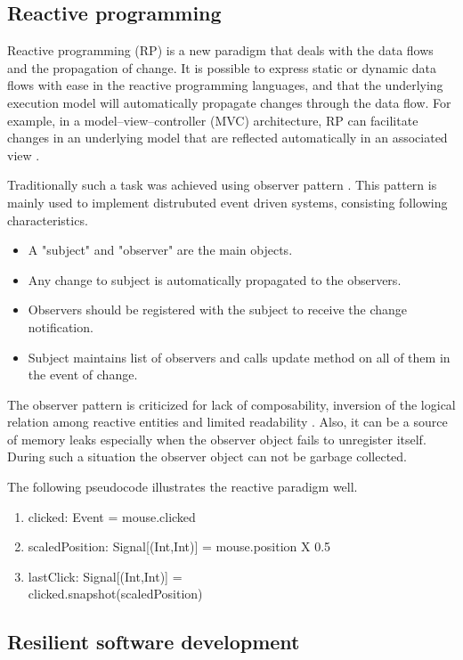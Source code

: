 \documentclass[conference]{IEEEtran}
\begin{document}
\subsection{Reactive programming}
Reactive programming (RP) is a new paradigm that deals with the data flows and the propagation of change. It is possible to express static or dynamic data flows with ease in the reactive programming languages, and that the underlying execution model will automatically propagate changes through the data flow. For example, in a model–view–controller (MVC) architecture, RP can facilitate changes in an underlying model that are reflected automatically in an associated view \cite{mvc}. \par
Traditionally such a task was achieved using observer pattern \cite{gof}. This pattern is mainly used to implement distrubuted event driven systems, consisting following characteristics.
\begin{itemize}
\item A "subject" and "observer" are the main objects.
\item Any change to subject is automatically propagated to the observers.
\item Observers should be registered with the subject to receive the change notification.
\item Subject maintains list of observers and calls update method on all of them in the event of change.
\end {itemize}
The observer pattern is criticized for lack of composability, inversion of the logical relation among reactive entities and limited readability \cite{observer}. Also, it can be a source of memory leaks especially when the observer object fails to unregister itself. During such a situation the observer object can not be garbage collected. \par

The following pseudocode illustrates the reactive paradigm well.

\begin{enumerate}
\item clicked: Event = mouse.clicked
\item scaledPosition: Signal[(Int,Int)] = mouse.position X 0.5
\item lastClick: Signal[(Int,Int)] = \\
      clicked.snapshot(scaledPosition)
\end{enumerate}



\subsection{Resilient software development}
\end{document}
